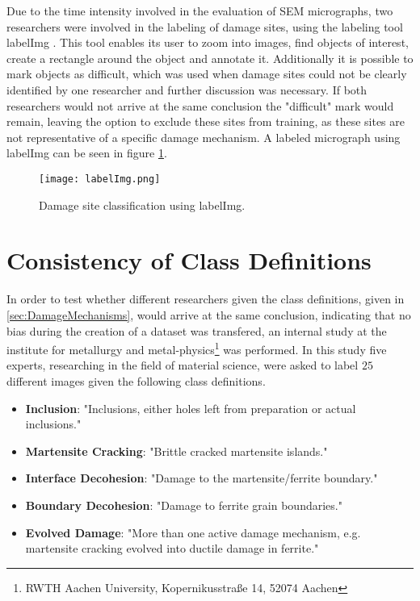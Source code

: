 Due to the time intensity involved in the evaluation of SEM micrographs, two researchers were involved in the labeling of damage sites, using the labeling tool labelImg \cite{labelImg}. This tool enables its user to zoom into images, find objects of interest, create a rectangle around the object and annotate it. Additionally it is possible to mark objects as difficult, which was used when damage sites could not be clearly identified by one researcher and further discussion was necessary. If both researchers would not arrive at the same conclusion the "difficult" mark would remain, leaving the option to exclude these sites from training, as these sites are not representative of a specific damage mechanism. A labeled micrograph using labelImg can be seen in figure \ref{fig:labelImg}. 

\begin{figure}[H]
\centering
\texttt{[image: labelImg.png]}
\caption{Damage site classification using labelImg.}
\label{fig:labelImg}
\end{figure}


\section{Consistency of Class Definitions}

In order to test whether different researchers given the class definitions, given in \ref{sec:DamageMechanisms}, would arrive at the same conclusion, indicating that no bias during the creation of a dataset was transfered, an internal study at the institute for metallurgy and metal-physics\footnote{RWTH Aachen University, Kopernikusstraße 14, 52074 Aachen} was performed. In this study five experts, researching in the field of material science, were asked to label $25$ different images given the following class definitions.\\

\begin{itemize}[label={}]
\item \textbf{Inclusion}: "Inclusions, either holes left from preparation or actual inclusions."
\item \textbf{Martensite Cracking}: "Brittle cracked martensite islands."
\item \textbf{Interface Decohesion}: "Damage to the martensite/ferrite boundary."
\item \textbf{Boundary Decohesion}: "Damage to ferrite grain boundaries."
\item \textbf{Evolved Damage}: "More than one active damage mechanism, e.g. martensite cracking evolved into ductile damage in ferrite."
\end{itemize}

